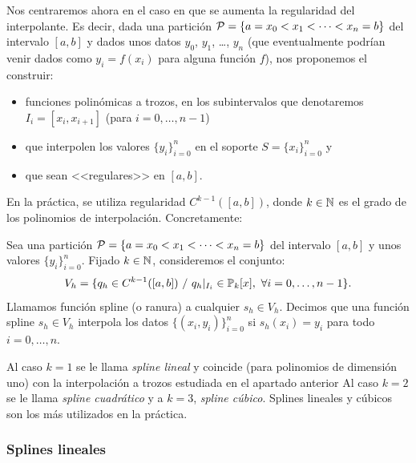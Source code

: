     Nos centraremos ahora en
    el caso en que se aumenta la regularidad del interpolante.
    Es decir, dada una partición 
    ${\cal P}= \{a = x_0 <x_1 < \cdots <x_n=b\}$
    del intervalo $[a,b]$ y dados unos datos $y_0$, $y_1$, \dots, $y_n$
    (que eventualmente podrían venir dados como $y_i=f(x_i)$ para alguna
    función $f$), nos proponemos el construir:
    \begin{itemize}
    \item  funciones polinómicas a trozos, en los subintervalos que
      denotaremos $I_i=[x_{i},x_{i+1}]$ (para $ i=0,\dots,n-1$)
    \item que interpolen los valores $\{y_i\}_{i=0}^n$ en el soporte
      $S=\{x_i\}_{i=0}^n$ y
    \item que sean <<regulares>> en $[a,b]$.
    \end{itemize}
    En la práctica, se utiliza regularidad $C^{k-1}([a,b])$, donde
    $k\in\operatorname{{\mathbb N}}$ es el grado de los polinomios de
    interpolación. Concretamente:%

    \begin{definition}
      \label{def:funcion-spline}
      Sea una partición ${\cal P}= \{a = x_0 <x_1 < \cdots <x_n=b\}$ del
      intervalo $[a,b]$ y unos valores $\{y_i\}_{i=0}^n$. Fijado
      $k\in\operatorname{{\mathbb N}}$, consideremos el conjunto:
      \begin{equation*}
        V_h = \{q_h \in C^{k-1}([a,b])\ / \ q_h|_{I_i}\in  \operatorname{{\mathbb P}}_k[x],\ \forall i=0,\dots,n-1\}.
    \end{equation*}
    Llamamos función spline (o ranura) a cualquier $s_h\in V_h$. Decimos que una
    función spline $s_h\in V_h$ interpola los datos $\{(x_i,y_i)\}_{i=0}^n$
    si $s_h(x_i)=y_i$ para todo $i=0,\dots,n$.
    \end{definition}

    Al caso $k=1$ se le llama \textit{spline lineal} y coincide (para
    polinomios de dimensión uno) con la interpolación a trozos estudiada
    en el apartado anterior Al caso $k=2$ se le llama \textit{spline
      cuadrático} y a $k=3$, \textit{spline cúbico}. Splines lineales y
    cúbicos son los más utilizados en la práctica.

    \subsubsection{Splines lineales}
    \label{sec:splines-lineales}

